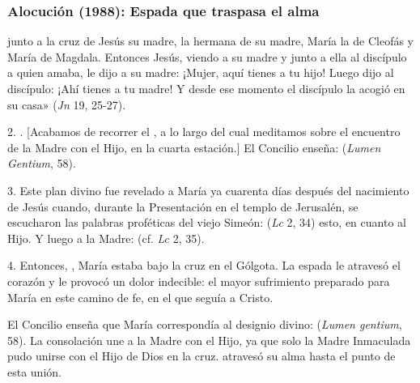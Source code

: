 \subsubsection{Alocución (1988): Espada que traspasa el alma}


\begin{body}

 junto a la cruz de Jesús su madre, la hermana de su madre, María la de Cleofás y María de Magdala. Entonces Jesús, viendo a su madre y junto a ella al discípulo a quien amaba, le dijo a su madre: ¡Mujer, aquí tienes a tu hijo! Luego dijo al discípulo: ¡Ahí tienes a tu madre! Y desde ese momento el discípulo la acogió en su casa» (\textit{Jn} 19, 25-27). 

2. . [Acabamos de recorrer el , a lo largo del cual meditamos sobre el encuentro de la Madre con el Hijo, en la cuarta estación.] El Concilio enseña:  (\textit{Lumen Gentium}, 58). 

3. Este plan divino fue revelado a María ya cuarenta días después del nacimiento de Jesús cuando, durante la Presentación en el templo de Jerusalén, se escucharon las palabras proféticas del viejo Simeón:  (\textit{Lc} 2, 34) esto, en cuanto al Hijo. Y luego a la Madre:  (cf. \textit{Lc} 2, 35). 

4. Entonces, , María estaba bajo la cruz en el Gólgota. La espada le atravesó el corazón y le provocó un dolor indecible: el mayor sufrimiento preparado para María en este camino de fe, en el que seguía a Cristo. 


El Concilio enseña que María correspondía al designio divino:  (\textit{Lumen gentium}, 58). La consolación une a la Madre con el Hijo, ya que solo la Madre Inmaculada pudo unirse con el Hijo de Dios en la cruz.  atravesó su alma hasta el punto de esta unión. 


\end{body}
